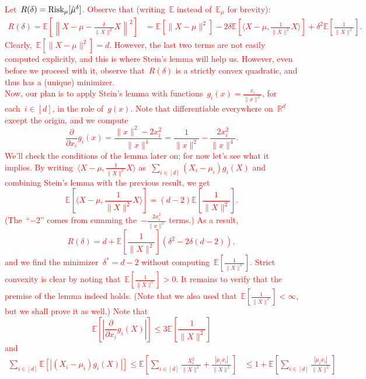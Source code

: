 \documentclass[11pt]{article}
\newcommand{\R}{\mathds{R}}
\newcommand{\E}{\mathds{E}}
\newcommand{\Risk}{\textup{Risk}}
\newcommand{\leqs}{\leqslant}
\renewcommand{\le}{\leqs}
\begin{document}
\begin{itemize}
\textcolor{red}{
Let~$R(\delta) = \Risk_{\mu}[\hat \mu^{\delta}]$. Observe that (writing~$\E$ instead of~$\E_{\mu}$ for brevity):
\[
\begin{aligned}
R(\delta) = \E \left[\left\|X - \mu - \frac{\delta}{\|X\|^2} X \right\|^2 \right] 
&= \E[\|X - \mu\|^2] - 2\delta \E \left[ \langle X-\mu, \frac{1}{\|X\|^2} X \rangle \right]  + \delta^2 \E \left[\frac{1}{\|X\|^2}\right].
\end{aligned}
\]
Clearly,~$\E[\|X - \mu\|^2] = d$. However, the last two terms are not easily computed explicitly, and this is where Stein's lemma will help us. 
However, even before we proceed with it, observe that~$R(\delta)$ is a strictly convex quadratic, and thus has a (unique) minimizer.\vspace{0.2cm}\\
Now, our plan is to apply Stein's lemma with functions~$g_i(x) = \frac{x_i}{\|x\|^2}$, for each~$i \in [d]$, in the role of~$g(x)$. 
Note that differentiable everywhere on~$\R^d$ except the origin, and we compute
\[
\frac{\partial}{\partial x_i} g_i(x) = \frac{\|x\|^2 - 2x_i^2}{\|x\|^4} = \frac{1}{\|x\|^2} - \frac{2x_i^2}{\|x\|^4}. 
\] 
We'll check the conditions of the lemma later on; for now let's see what it implies. 
By writing~$\langle X- \mu, \frac{1}{\| X \|^2} X \rangle$ as~$\sum_{i \in [d]} (X_i-\mu_i) g_i(X)$ and combining Stein's lemma with the previous result, we get
\[
\E\left[\langle X- \mu, \frac{1}{\| X \|^2} X \rangle \right] = (d-2) \E \left[\frac{1}{\|X\|^2} \right].
\]
(The~``$-2$'' comes from summing the~$-\frac{2x_i^2}{\|x\|^4}$ terms.) As a result,
\[
R(\delta) = d + \E \left[\frac{1}{\|X\|^2} \right] (\delta^2 - 2\delta(d-2)),
\]
and we find the minimizer~$\delta^* = d-2$ without computing~$\E \left[\frac{1}{\|X\|^2} \right]$. Strict convexity is clear by noting that~$\E \left[\frac{1}{\|X\|^2} \right] > 0$.
It remains to verify that the premise of the lemma indeed holds. (Note that we also used that~$\E \left[\frac{1}{\|X\|^2} \right] < \infty$, but we shall prove it as well.) Note that
\[
\E\left[\left|\frac{\partial}{\partial x_i} g_i(X) \right|\right] \le 3 \E \left[\frac{1}{\|X\|^2} \right] 
\]
and
\[
\begin{aligned}
\sum_{i \in [d]} \E [|(X_i - \mu_i)g_i(X)|] 
\le 
\E \left [ \sum_{i \in [d]} \frac{X_i^2}{\|X\|^2} + \frac{|\mu_i x_i|}{\|X\|^2} \right] 
&\le 1 + \E \left [ \sum_{i \in [d]} \frac{|\mu_i x_i|}{\|X\|^2} \right] \\

\end{aligned}\]}
\end{itemize}
\end{document}
